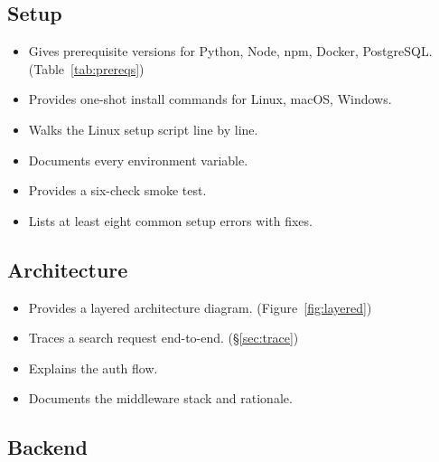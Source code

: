 \documentclass[11pt,a4paper,oneside]{book}
\DeclareRobustCommand{\inlinecode}[1]{\texorpdfstring{\colorbox{codebg}{\strut\ttfamily\small\detokenize{#1}}}{#1}}
\begin{document}
\subsection{Setup}
\begin{itemize}
  \item[$\square$] Gives prerequisite versions for Python, Node, npm,
        Docker, PostgreSQL. (Table~\ref{tab:prereqs})
  \item[$\square$] Provides one-shot install commands for Linux,
        macOS, Windows.
  \item[$\square$] Walks the Linux setup script line by line.
  \item[$\square$] Documents every environment variable.
  \item[$\square$] Provides a six-check smoke test.
  \item[$\square$] Lists at least eight common setup errors with fixes.
\end{itemize}

\subsection{Architecture}
\begin{itemize}
  \item[$\square$] Provides a layered architecture diagram. (Figure~\ref{fig:layered})
  \item[$\square$] Traces a search request end-to-end. (\S\ref{sec:trace})
  \item[$\square$] Explains the auth flow.
  \item[$\square$] Documents the middleware stack and rationale.
\end{itemize}

\subsection{Backend}
\end{document}

